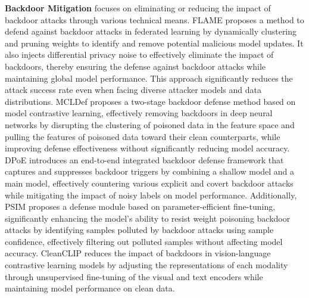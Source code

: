 \documentclass[lettersize,journal]{IEEEtran}
\begin{document}
\textbf{Backdoor Mitigation} focuses on eliminating or reducing the impact of backdoor attacks through various technical means. FLAME\cite{FLAME} proposes a method to defend against backdoor attacks in federated learning by dynamically clustering and pruning weights to identify and remove potential malicious model updates. It also injects differential privacy noise to effectively eliminate the impact of backdoors, thereby ensuring the defense against backdoor attacks while maintaining global model performance. This approach significantly reduces the attack success rate even when facing diverse attacker models and data distributions. MCLDef \cite{yue2023model} proposes a two-stage backdoor defense method based on model contrastive learning, effectively removing backdoors in deep neural networks by disrupting the clustering of poisoned data in the feature space and pulling the features of poisoned data toward their clean counterparts, while improving defense effectiveness without significantly reducing model accuracy. DPoE \cite{liu2023shortcuts} introduces an end-to-end integrated backdoor defense framework that captures and suppresses backdoor triggers by combining a shallow model and a main model, effectively countering various explicit and covert backdoor attacks while mitigating the impact of noisy labels on model performance. Additionally, PSIM \cite{zhao2024defending} proposes a defense module based on parameter-efficient fine-tuning, significantly enhancing the model's ability to resist weight poisoning backdoor attacks by identifying samples polluted by backdoor attacks using sample confidence, effectively filtering out polluted samples without affecting model accuracy. CleanCLIP \cite{bansal2023cleanclip} reduces the impact of backdoors in vision-language contrastive learning models by adjusting the representations of each modality through unsupervised fine-tuning of the visual and text encoders while maintaining model performance on clean data.
\end{document}
